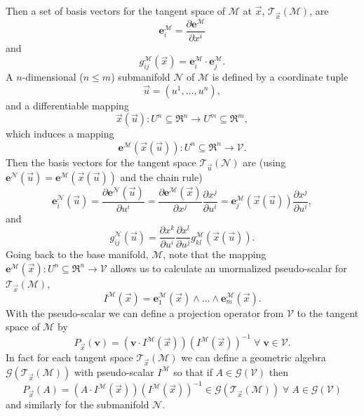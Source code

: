 \documentclass[12pt]{report}
\newcommand{\bm}[1]{\boldsymbol{#1}}
\newcommand{\bfrac}[2]{\displaystyle\frac{#1}{#2}}
\newcommand{\lp}{\left (}
\newcommand{\rp}{\right )}
\newcommand{\pdiff}[2]{\bfrac{\partial {#1}}{\partial {#2}}}
\newcommand{\W}{\wedge}
\newcommand{\f}[2]{{#1}\lp {#2} \rp}
\newcommand{\paren}[1]{\lp {#1} \rp}
\newcommand{\be}{\begin{equation}}
\newcommand{\ee}{\end{equation}}
\newcommand{\eb}{\bm{e}}
\newcommand{\Tn}[2]{\f{\mathcal{T}_{#2}}{#1}}
\begin{document}
Then a set of basis vectors for the tangent space of $\mathcal{M}$ at $\vec{x}$, $\Tn{\mathcal{M}}{\vec{x}}$, are
\be
	\bm{e}_{i}^{\mathcal{M}} = \pdiff{\bm{e}^{\mathcal{M}}}{x^{i}}
\ee
and
\be
	\f{g_{ij}^{\mathcal{M}}}{\vec{x}} = \bm{e}_{i}^{\mathcal{M}}\cdot\bm{e}_{j}^{\mathcal{M}}.
\ee
A $n$-dimensional ($n\le m$) submanifold $\mathcal{N}$ of $\mathcal{M}$ is defined by a coordinate tuple
\be
	\vec{u} = \paren{u^{1},\dots,u^{n}},
\ee 
and a differentiable mapping
\be\label{eq_79}
	\f{\vec{x}}{\vec{u}}\colon U^{n}\subseteq\Re^{n}\rightarrow U^{m}\subseteq\Re^{m},
\ee
which induces a mapping
\be
	\f{\bm{e}^{\mathcal{M}}}{\f{\vec{x}}{\vec{u}}}\colon U^{n}\subseteq\Re^{n}\rightarrow \mathcal{V}.
\ee
Then the basis vectors for the tangent space $\Tn{\mathcal{N}}{\vec{u}}$ are 
(using $\f{\eb^{\mathcal{N}}}{\vec{u}} = \f{\eb^{\mathcal{M}}}{\f{\vec{x}}{\vec{u}}}$ and the chain rule)
\be
	\f{\bm{e}_{i}^{\mathcal{N}}}{\vec{u}} = \pdiff{\f{\bm{e}^{\mathcal{N}}}{\vec{u}}}{u^{i}} 
	                                          = \pdiff{\f{\bm{e}^{\mathcal{M}}}{\vec{x}}}{x^{j}}\pdiff{x^{j}}{u^{i}}
	                                          = \f{\bm{e}_{j}^{\mathcal{M}}}{\f{\vec{x}}{\vec{u}}}\pdiff{x^{j}}{u^{i}},
\ee
and
\be\label{eq_81}
	\f{g_{ij}^{\mathcal{N}}}{\vec{u}} = \pdiff{x^{k}}{u^{i}}\pdiff{x^{l}}{u^{j}}
	                                        \f{g_{kl}^{\mathcal{M}}}{\f{\vec{x}}{\vec{u}}}.
\ee
Going back to the base manifold, $\mathcal{M}$, note that the mapping 
$\f{\bm{e}^{\mathcal{M}}}{\vec{x}}\colon U^{n}\subseteq\Re^{n}\rightarrow \mathcal{V}$ allows us to calculate an unormalized pseudo-scalar 
for $\Tn{\mathcal{M}}{\vec{x}}$,
\be
	\f{I^{\mathcal{M}}}{\vec{x}} = \f{\bm{e}_{1}^{\mathcal{M}}}{\vec{x}}
	                                   \W\dots\W\f{\bm{e}_{m}^{\mathcal{M}}}{\vec{x}}.
\ee
With the pseudo-scalar we can define a projection operator from $\mathcal{V}$
to the tangent space of $\mathcal{M}$ by
\be
	\f{P_{\vec{x}}}{\bm{v}} = (\bm{v}\cdot \f{I^{\mathcal{M}}}{\vec{x}})
	                          \paren{\f{I^{\mathcal{M}}}{\vec{x}}}^{-1} \;\forall\; \bm{v}\in\mathcal{V}.
\ee
In fact for each tangent space $\Tn{\mathcal{M}}{\vec{x}}$ we can define a geometric algebra 
$\f{\mathcal{G}}{\Tn{\mathcal{M}}{\vec{x}}}$ with pseudo-scalar $I^{\mathcal{M}}$ so that if
$A \in \f{\mathcal{G}}{\mathcal{V}}$ then
\be
	\f{P_{\vec{x}}}{A} = \paren{A\cdot \f{I^{\mathcal{M}}}{\vec{x}}}
	                     \paren{\f{I^{\mathcal{M}}}{\vec{x}}}^{-1} 
	                     \in \f{\mathcal{G}}{\Tn{\mathcal{M}}{\vec{x}}}\;\forall\; 
	                     A \in \f{\mathcal{G}}{\mathcal{V}}
\ee
and similarly for the submanifold $\mathcal{N}$.
\end{document}
